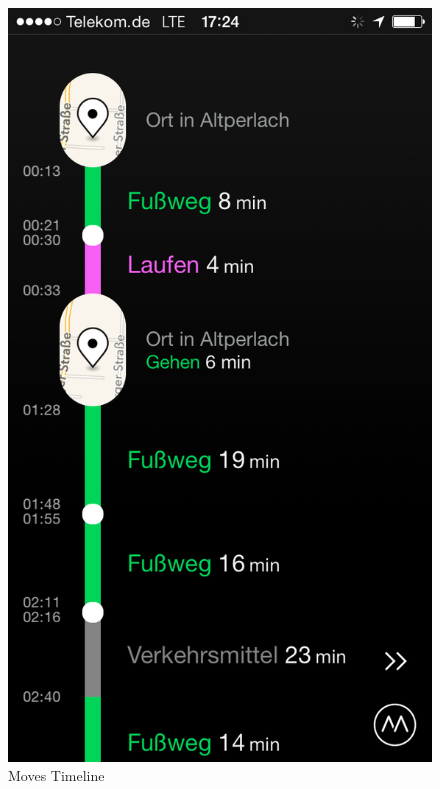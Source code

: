 \begin{figure}[H]
 \centering
 \includegraphics[scale=0.3]{images/moves_app_screenshot.png}
 \caption{Moves Timeline \cite{fig:Timeline}}
 \label{fig:Timeline}
\end{figure}

